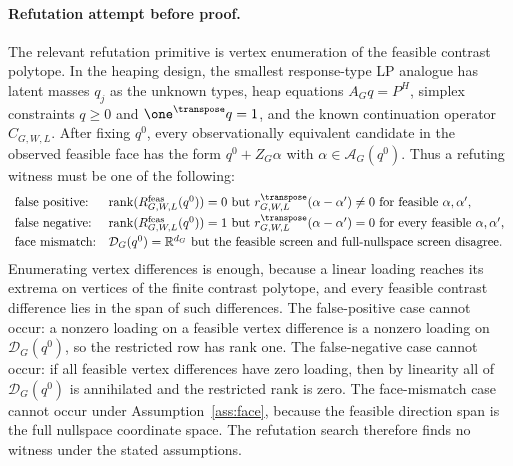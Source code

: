 \paragraph{Refutation attempt before proof.}
The relevant refutation primitive is vertex enumeration of the feasible contrast polytope.  In the heaping design, the smallest response-type LP analogue has latent masses \(q_j\) as the unknown types, heap equations \(A_Gq=P^H\), simplex constraints \(q\ge0\) and \(\one^{\transpose}q=1\), and the known continuation operator \(C_{G,W,L}\).  After fixing \(q^0\), every observationally equivalent candidate in the observed feasible face has the form \(q^0+Z_G\alpha\) with \(\alpha\in\mathcal{A}_G(q^0)\).  Thus a refuting witness must be one of the following:
\[
\begin{array}{ll}
\text{false positive:} & \operatorname{rank}(R^{\mathrm{feas}}_{G,W,L}(q^0))=0
\text{ but } r_{G,W,L}^{\transpose}(\alpha-\alpha')\ne0
\text{ for feasible }\alpha,\alpha',\\[3pt]
\text{false negative:} & \operatorname{rank}(R^{\mathrm{feas}}_{G,W,L}(q^0))=1
\text{ but } r_{G,W,L}^{\transpose}(\alpha-\alpha')=0
\text{ for every feasible }\alpha,\alpha',\\[3pt]
\text{face mismatch:} &
\mathcal{D}_G(q^0)=\mathbb{R}^{d_G}
\text{ but the feasible screen and full-nullspace screen disagree.}
\end{array}
\]
Enumerating vertex differences is enough, because a linear loading reaches its extrema on vertices of the finite contrast polytope, and every feasible contrast difference lies in the span of such differences.  The false-positive case cannot occur: a nonzero loading on a feasible vertex difference is a nonzero loading on \(\mathcal{D}_G(q^0)\), so the restricted row has rank one.  The false-negative case cannot occur: if all feasible vertex differences have zero loading, then by linearity all of \(\mathcal{D}_G(q^0)\) is annihilated and the restricted rank is zero.  The face-mismatch case cannot occur under Assumption~\ref{ass:face}, because the feasible direction span is the full nullspace coordinate space.  The refutation search therefore finds no witness under the stated assumptions.

